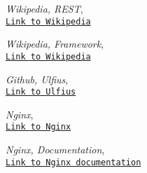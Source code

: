 \documentclass[12pt,a4paper]{article}
\begin{document}
\begin{thebibliography}{9}
\emph{Wikipedia, REST},
\\\texttt{\href{https://en.wikipedia.org/wiki/Representational_state_transfer}{Link to Wikipedia}}

\emph{Wikipedia, Framework},
\\\texttt{\href{https://en.wikipedia.org/wiki/Software_framework}{Link to Wikipedia}}

\emph{Github, Ulfius},
\\\texttt{\href{https://github.com/babelouest/ulfius}{Link to Ulfius}}

\emph{Nginx},
\\\texttt{\href{https://nginx.org/en/}{Link to Nginx}}

\emph{Nginx, Documentation},
\\\texttt{\href{https://docs.nginx.com/}{Link to Nginx documentation}}

\end{thebibliography}
\end{document}
